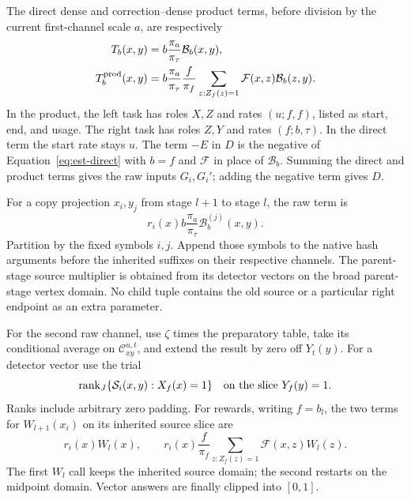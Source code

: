 The direct dense and correction--dense product terms, before division by
the current first-channel scale $a$, are respectively
\begin{align}
 T_b(x,y)&=b\frac{\pi_a}{\pi_\tau}\mathcal B_b(x,y),
 \label{eq:est-direct}\\
 T_b^{\rm prod}(x,y)&=
 b\frac{\pi_a}{\pi_\tau}\frac f{\pi_f}
 \sum_{z:Z_f(z)=1}\mathcal F(x,z)\mathcal B_b(z,y).
 \label{eq:est-product}
\end{align}
In the product, the left task has roles $X,Z$ and rates
$(u;f,f)$, listed as start, end, and usage.  The right task has roles
$Z,Y$ and rates $(f;b,\tau)$.  In the direct term the start rate stays $u$.
The term $-E$ in $D$ is the negative of
Equation~\eqref{eq:est-direct} with $b=f$ and $\mathcal F$ in place of
$\mathcal B_b$.  Summing the direct and product terms gives the raw inputs
$G_i,G_i'$; adding the negative term gives $D$.

For a copy projection $x_i,y_j$ from stage $l+1$ to stage $l$, the raw term
is
\begin{equation}
 r_i(x)b\frac{\pi_a}{\pi_\tau}\mathcal B_b^{(j)}(x,y).
 \label{eq:est-projection}
\end{equation}
Partition by the fixed symbols $i,j$.  Append those symbols to the native
hash arguments before the inherited suffixes on their respective channels.
The parent-stage source multiplier is obtained from its detector vectors
on the broad parent-stage vertex domain.  No child tuple contains the old
source or a particular right endpoint as an extra parameter.

For the second raw channel, use $\zeta$ times the preparatory table, take
its conditional average on $\mathcal C_{xy}^{u,t}$, and extend the result
by zero off $Y_t(y)$.  For a detector vector use the trial
\begin{equation}
 \operatorname{rank}_{J}
       \{\mathcal S_i(x,y):X_f(x)=1\}
 \quad\hbox{on the slice }Y_f(y)=1.
 \label{eq:est-detector}
\end{equation}
Ranks include arbitrary zero padding.  For rewards, writing $f=b_l$, the
two terms for $W_{l+1}(x_i)$ on its inherited source slice are
\begin{equation}
 r_i(x)W_l(x),\qquad
 r_i(x)\frac f{\pi_f}
       \sum_{z:Z_f(z)=1}\mathcal F(x,z)W_l(z).
 \label{eq:est-reward}
\end{equation}
The first $W_l$ call keeps the inherited source domain; the second restarts
on the midpoint domain.  Vector answers are finally clipped into $[0,1]$.

